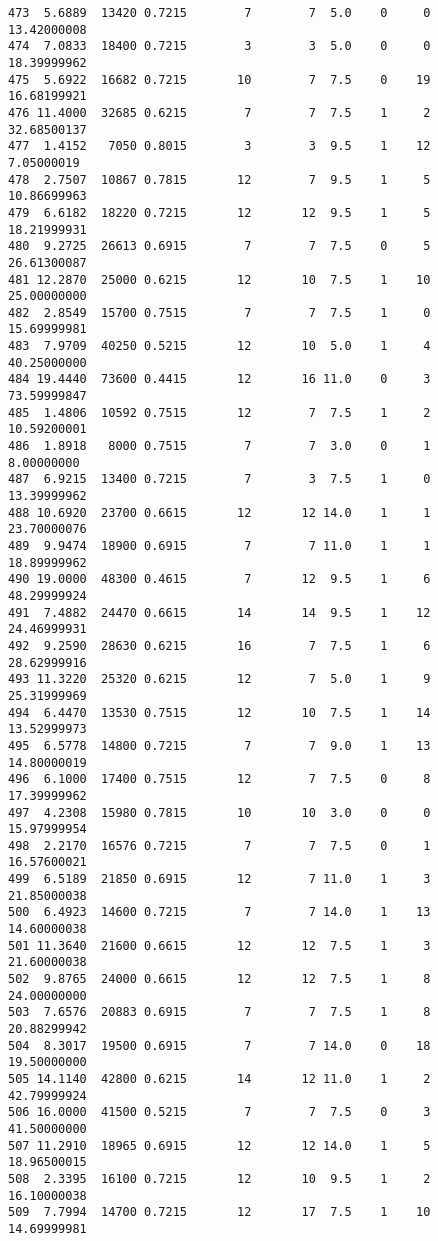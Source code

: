\documentclass[
  letterpaper,
  DIV=11,
  numbers=noendperiod]{scrreprt}
\begin{document}
\begin{verbatim}
473  5.6889  13420 0.7215        7        7  5.0    0     0 13.42000008
474  7.0833  18400 0.7215        3        3  5.0    0     0 18.39999962
475  5.6922  16682 0.7215       10        7  7.5    0    19 16.68199921
476 11.4000  32685 0.6215        7        7  7.5    1     2 32.68500137
477  1.4152   7050 0.8015        3        3  9.5    1    12  7.05000019
478  2.7507  10867 0.7815       12        7  9.5    1     5 10.86699963
479  6.6182  18220 0.7215       12       12  9.5    1     5 18.21999931
480  9.2725  26613 0.6915        7        7  7.5    0     5 26.61300087
481 12.2870  25000 0.6215       12       10  7.5    1    10 25.00000000
482  2.8549  15700 0.7515        7        7  7.5    1     0 15.69999981
483  7.9709  40250 0.5215       12       10  5.0    1     4 40.25000000
484 19.4440  73600 0.4415       12       16 11.0    0     3 73.59999847
485  1.4806  10592 0.7515       12        7  7.5    1     2 10.59200001
486  1.8918   8000 0.7515        7        7  3.0    0     1  8.00000000
487  6.9215  13400 0.7215        7        3  7.5    1     0 13.39999962
488 10.6920  23700 0.6615       12       12 14.0    1     1 23.70000076
489  9.9474  18900 0.6915        7        7 11.0    1     1 18.89999962
490 19.0000  48300 0.4615        7       12  9.5    1     6 48.29999924
491  7.4882  24470 0.6615       14       14  9.5    1    12 24.46999931
492  9.2590  28630 0.6215       16        7  7.5    1     6 28.62999916
493 11.3220  25320 0.6215       12        7  5.0    1     9 25.31999969
494  6.4470  13530 0.7515       12       10  7.5    1    14 13.52999973
495  6.5778  14800 0.7215        7        7  9.0    1    13 14.80000019
496  6.1000  17400 0.7515       12        7  7.5    0     8 17.39999962
497  4.2308  15980 0.7815       10       10  3.0    0     0 15.97999954
498  2.2170  16576 0.7215        7        7  7.5    0     1 16.57600021
499  6.5189  21850 0.6915       12        7 11.0    1     3 21.85000038
500  6.4923  14600 0.7215        7        7 14.0    1    13 14.60000038
501 11.3640  21600 0.6615       12       12  7.5    1     3 21.60000038
502  9.8765  24000 0.6615       12       12  7.5    1     8 24.00000000
503  7.6576  20883 0.6915        7        7  7.5    1     8 20.88299942
504  8.3017  19500 0.6915        7        7 14.0    0    18 19.50000000
505 14.1140  42800 0.6215       14       12 11.0    1     2 42.79999924
506 16.0000  41500 0.5215        7        7  7.5    0     3 41.50000000
507 11.2910  18965 0.6915       12       12 14.0    1     5 18.96500015
508  2.3395  16100 0.7215       12       10  9.5    1     2 16.10000038
509  7.7994  14700 0.7215       12       17  7.5    1    10 14.69999981

\end{verbatim}
\end{document}
